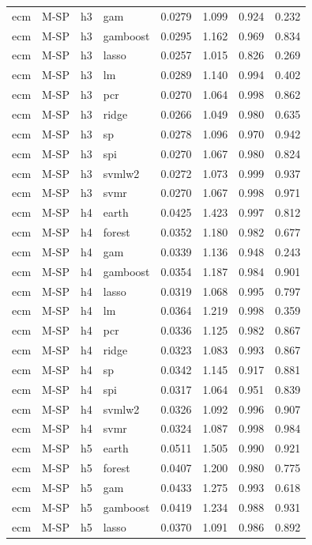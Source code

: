 \begin{ThreePartTable}
\begin{longtable}[t]{llclcccc}
ecm & M-SP & h3 & gam & 0.0279 & 1.099 & 0.924 & 0.232\\
ecm & M-SP & h3 & gamboost & 0.0295 & 1.162 & 0.969 & 0.834\\
ecm & M-SP & h3 & lasso & 0.0257 & 1.015 & 0.826 & 0.269\\
ecm & M-SP & h3 & lm & 0.0289 & 1.140 & 0.994 & 0.402\\
ecm & M-SP & h3 & pcr & 0.0270 & 1.064 & 0.998 & 0.862\\
ecm & M-SP & h3 & ridge & 0.0266 & 1.049 & 0.980 & 0.635\\
ecm & M-SP & h3 & sp & 0.0278 & 1.096 & 0.970 & 0.942\\
ecm & M-SP & h3 & spi & 0.0270 & 1.067 & 0.980 & 0.824\\
ecm & M-SP & h3 & svmlw2 & 0.0272 & 1.073 & 0.999 & 0.937\\
ecm & M-SP & h3 & svmr & 0.0270 & 1.067 & 0.998 & 0.971\\
\addlinespace
ecm & M-SP & h4 & earth & 0.0425 & 1.423 & 0.997 & 0.812\\
ecm & M-SP & h4 & forest & 0.0352 & 1.180 & 0.982 & 0.677\\
ecm & M-SP & h4 & gam & 0.0339 & 1.136 & 0.948 & 0.243\\
ecm & M-SP & h4 & gamboost & 0.0354 & 1.187 & 0.984 & 0.901\\
ecm & M-SP & h4 & lasso & 0.0319 & 1.068 & 0.995 & 0.797\\
ecm & M-SP & h4 & lm & 0.0364 & 1.219 & 0.998 & 0.359\\
ecm & M-SP & h4 & pcr & 0.0336 & 1.125 & 0.982 & 0.867\\
ecm & M-SP & h4 & ridge & 0.0323 & 1.083 & 0.993 & 0.867\\
ecm & M-SP & h4 & sp & 0.0342 & 1.145 & 0.917 & 0.881\\
ecm & M-SP & h4 & spi & 0.0317 & 1.064 & 0.951 & 0.839\\
ecm & M-SP & h4 & svmlw2 & 0.0326 & 1.092 & 0.996 & 0.907\\
ecm & M-SP & h4 & svmr & 0.0324 & 1.087 & 0.998 & 0.984\\
\addlinespace
ecm & M-SP & h5 & earth & 0.0511 & 1.505 & 0.990 & 0.921\\
ecm & M-SP & h5 & forest & 0.0407 & 1.200 & 0.980 & 0.775\\
ecm & M-SP & h5 & gam & 0.0433 & 1.275 & 0.993 & 0.618\\
ecm & M-SP & h5 & gamboost & 0.0419 & 1.234 & 0.988 & 0.931\\
ecm & M-SP & h5 & lasso & 0.0370 & 1.091 & 0.986 & 0.892\\

\end{longtable}
\end{ThreePartTable}
